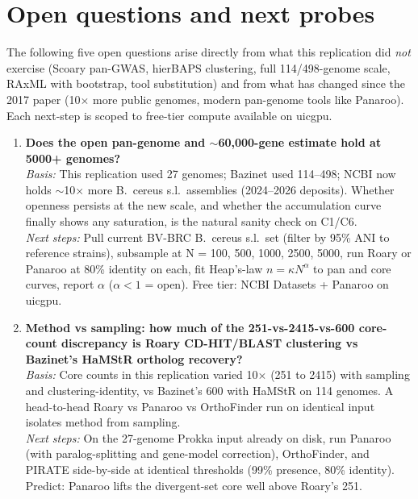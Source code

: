 \section{Open questions and next probes}

The following five open questions arise directly from what this replication did \emph{not} exercise (Scoary pan-GWAS, hierBAPS clustering, full 114/498-genome scale, RAxML with bootstrap, tool substitution) and from what has changed since the 2017 paper (10$\times$ more public genomes, modern pan-genome tools like Panaroo). Each next-step is scoped to free-tier compute available on uicgpu.

\begin{enumerate}
    \item \textbf{Does the open pan-genome and $\sim$60{,}000-gene estimate hold at 5000+ genomes?}\\
    \emph{Basis:} This replication used 27 genomes; Bazinet used 114--498; NCBI now holds $\sim$10$\times$ more B.\ cereus s.l.\ assemblies (2024--2026 deposits). Whether openness persists at the new scale, and whether the accumulation curve finally shows any saturation, is the natural sanity check on C1/C6.\\
    \emph{Next steps:} Pull current BV-BRC B.\ cereus s.l.\ set (filter by 95\% ANI to reference strains), subsample at N = 100, 500, 1000, 2500, 5000, run Roary or Panaroo at 80\% identity on each, fit Heap's-law $n = \kappa N^\alpha$ to pan and core curves, report $\alpha$ ($\alpha<1$ = open). Free tier: NCBI Datasets + Panaroo on uicgpu.

    \item \textbf{Method vs sampling: how much of the 251-vs-2415-vs-600 core-count discrepancy is Roary CD-HIT/BLAST clustering vs Bazinet's HaMStR ortholog recovery?}\\
    \emph{Basis:} Core counts in this replication varied 10$\times$ (251 to 2415) with sampling and clustering-identity, vs Bazinet's 600 with HaMStR on 114 genomes. A head-to-head Roary vs Panaroo vs OrthoFinder run on identical input isolates method from sampling.\\
    \emph{Next steps:} On the 27-genome Prokka input already on disk, run Panaroo (with paralog-splitting and gene-model correction), OrthoFinder, and PIRATE side-by-side at identical thresholds (99\% presence, 80\% identity). Predict: Panaroo lifts the divergent-set core well above Roary's 251.


\end{enumerate}
